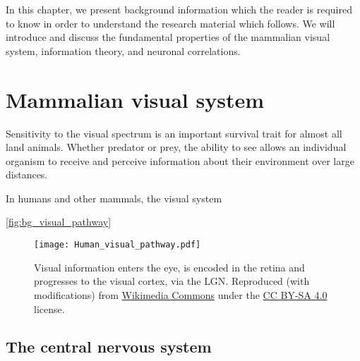 

In this chapter, we present background information which the reader is required to know in order to understand the research material which follows.
We will introduce and discuss the fundamental properties of the mammalian visual system, information theory, and neuronal correlations.


\section{Mammalian visual system}

\citet[Chapter~2]{nsbook} %
\citet[Chapter~11]{nsbook} %
\citet[Chapter~23]{nsbook} %


Sensitivity to the visual spectrum is an important survival trait for almost all land animals.
Whether predator or prey, the ability to see allows an individual organism to receive and perceive information about their environment over large distances.

In humans and other mammals, the visual system

\autoref{fig:bg_visual_pathway}

\begin{figure}[htbp]
\centering
\texttt{[image: Human\_visual\_pathway.pdf]}
\caption{%
Visual information enters the eye, is encoded in the retina and progresses to the visual cortex, via the \ac{LGN}.
Reproduced (with modifications) from \href{https://commons.wikimedia.org/wiki/File:Human_visual_pathway.svg}{Wikimedia Commons} under the \href{https://creativecommons.org/licenses/by-sa/4.0/deed.en}{CC BY-SA 4.0} license.
}
\label{fig:bg_visual_pathway}
\end{figure}


\subsection{The central nervous system}

